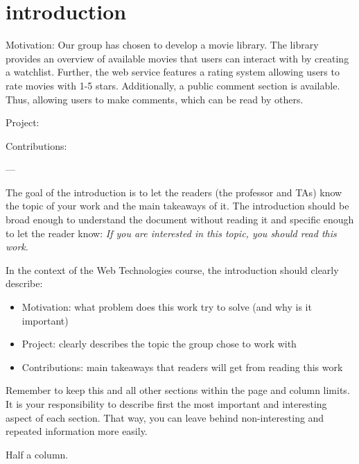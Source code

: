 \section{introduction}

\noindent Motivation:
\noindent Our group has chosen to develop a movie library. 
The library provides an overview of available movies that users can interact with by creating a watchlist. 
Further, the web service features a rating system allowing users to rate movies with 1-5 stars. 
Additionally, a public comment section is available. 
Thus, allowing users to make comments, which can be read by others.

\noindent Project:
\noindent 

\noindent Contributions:
\noindent 

---

\noindent The goal of the introduction is to let the readers (the professor and TAs) know the topic of your work and the main takeaways of it.
The introduction should be broad enough to understand the document without reading it and specific enough to let the reader know: \textit{If you are interested in this topic, you should read this work}.

\noindent In the context of the Web Technologies course, the introduction should clearly describe:

\begin{itemize}
    \item Motivation: what problem does this work try to solve (and why is it important)
    \item Project: clearly describes the topic the group chose to work with
    \item Contributions: main takeaways that readers will get from reading this work
\end{itemize}


\noindent Remember to keep this and all other sections within the page and column limits.
It is your responsibility to describe first the most important and interesting aspect of each section.
That way, you can leave behind non-interesting and repeated information more easily.

 Half a column.
